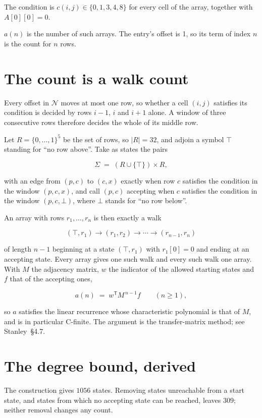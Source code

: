 \documentclass[11pt]{article}
\theoremstyle{definition}
\begin{document}
The condition is $c(i,j) \in \{0, 1, 3, 4, 8\}$ for every cell of the array, together with $A[0][0]=0$.

$a(n)$ is the number of such arrays. The entry's offset is 1, so its term of index $n$ is the count for $n$ rows.

\section{The count is a walk count}

Every offset in $\mathcal{N}$ moves at most one row, so whether a cell $(i,j)$ satisfies its condition is decided by rows $i-1$, $i$ and $i+1$ alone. A window of three consecutive rows therefore decides the whole of its middle row.

Let $R = \{0,\dots,1\}^{5}$ be the set of rows, so $|R| = 32$, and adjoin a symbol $\top$ standing for ``no row above''. Take as states the pairs

\[\Sigma \;=\; (R \cup \{\top\}) \times R,\]

with an edge from $(p,c)$ to $(c,x)$ exactly when row $c$ satisfies the condition in the window $(p,c,x)$, and call $(p,c)$ accepting when $c$ satisfies the condition in the window $(p,c,\bot)$, where $\bot$ stands for ``no row below''.

An array with rows $r_1,\dots,r_n$ is then exactly a walk

\[(\top,r_1) \to (r_1,r_2) \to \cdots \to (r_{n-1},r_n)\]

of length $n-1$ beginning at a state $(\top,r_1)$ with $r_1[0]=0$ and ending at an accepting state. Every array gives one such walk and every such walk one array. With $M$ the adjacency matrix, $w$ the indicator of the allowed starting states and $f$ that of the accepting ones,

\[a(n) \;=\; w^{\mathsf T} M^{\,n-1} f \qquad (n \ge 1),\]

so $a$ satisfies the linear recurrence whose characteristic polynomial is that of $M$, and is in particular C-finite. The argument is the transfer-matrix method; see Stanley~\S4.7.

\section{The degree bound, derived}

The construction gives $1056$ states. Removing states unreachable from a start state, and states from which no accepting state can be reached, leaves $309$; neither removal changes any count.
\end{document}
